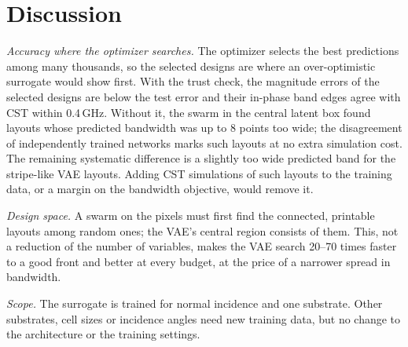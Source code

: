 \section{Discussion}
\emph{Accuracy where the optimizer searches.} The optimizer selects the best predictions among many thousands, so the selected designs are where an over-optimistic surrogate would show first. With the trust check, the magnitude errors of the selected designs are below the test error and their in-phase band edges agree with CST within 0.4\,GHz. Without it, the swarm in the central latent box found layouts whose predicted bandwidth was up to 8 points too wide; the disagreement of independently trained networks marks such layouts at no extra simulation cost. The remaining systematic difference is a slightly too wide predicted band for the stripe-like VAE layouts. Adding CST simulations of such layouts to the training data, or a margin on the bandwidth objective, would remove it.

\emph{Design space.} A swarm on the pixels must first find the connected, printable layouts among random ones; the VAE's central region consists of them. This, not a reduction of the number of variables, makes the VAE search 20--70 times faster to a good front and better at every budget, at the price of a narrower spread in bandwidth.

\emph{Scope.} The surrogate is trained for normal incidence and one substrate. Other substrates, cell sizes or incidence angles need new training data, but no change to the architecture or the training settings.

